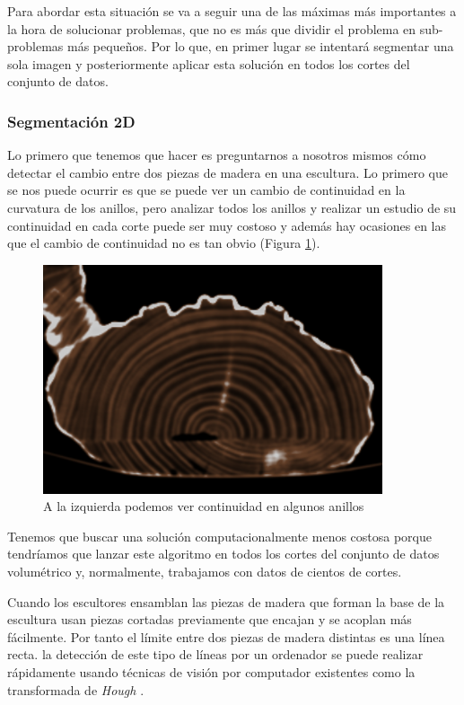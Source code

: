 Para abordar esta situación se va a seguir una de las máximas más importantes a la hora de solucionar problemas, que no es más que dividir el problema en sub-problemas más pequeños. Por lo que, en primer lugar se intentará segmentar una sola imagen y posteriormente aplicar esta solución en todos los cortes del conjunto de datos.

\subsubsection{Segmentación 2D}

Lo primero que tenemos que hacer es preguntarnos a nosotros mismos cómo detectar el cambio entre dos piezas de madera en una escultura. Lo primero que se nos puede ocurrir es que se puede ver un cambio de continuidad en la curvatura de los anillos, pero analizar todos los anillos y realizar un estudio de su continuidad en cada corte puede ser muy costoso y además hay ocasiones en las que el cambio de continuidad no es tan obvio (Figura \ref{fig:desarrollo/continuidad-anillos}).

\begin{figure}[H]
	\centering
	\includegraphics[width=10cm]{imagenes/desarrollo/continuidad-anillos}
	\caption{A la izquierda podemos ver continuidad en algunos anillos}
	\label{fig:desarrollo/continuidad-anillos}
\end{figure}

Tenemos que buscar una solución computacionalmente menos costosa porque tendríamos que lanzar este algoritmo en todos los cortes del conjunto de datos volumétrico y, normalmente, trabajamos con datos de cientos de cortes.

Cuando los escultores ensamblan las piezas de madera que forman la base de la escultura usan piezas cortadas previamente que encajan y se acoplan más fácilmente. Por tanto el límite entre dos piezas de madera distintas es una línea recta. la detección de este tipo de líneas por un ordenador se puede realizar rápidamente usando técnicas de visión por computador existentes como la transformada de \textit{Hough} \cite{duda72}.

